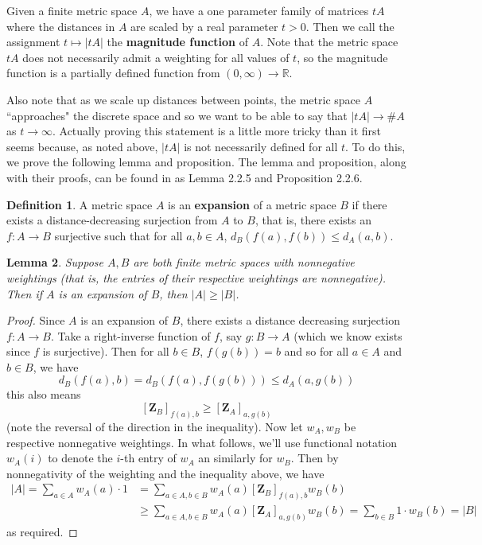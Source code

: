 \documentclass[11pt]{article}
\theoremstyle{definition}
\newtheorem{defn}{Definition}
\theoremstyle{definition}
\theoremstyle{plain}
\theoremstyle{plain}
\theoremstyle{plain}
\newtheorem{lem}[defn]{Lemma}
\theoremstyle{definition}
\begin{document}
Given a finite metric space $A$, we have a one parameter family of matrices $tA$ where the distances in $A$ are scaled by a real parameter $t > 0$. Then we call the assignment $t\mapsto\vert tA \vert$ the \textbf{magnitude function} of $A$. Note that the metric space $tA$ does not necessarily admit a weighting for all values of $t$, so the magnitude function is a partially defined function from $(0,\infty)\to\mathbb{R}$.

Also note that as we scale up distances between points, the metric space $A$ ``approaches" the discrete space and so we want to be able to say that $\vert tA \vert \to \#A$ as $t \to \infty$. Actually proving this statement is a little more tricky than it first seems because, as noted above, $\vert tA \vert$ is not necessarily defined for all $t$. To do this, we prove the following lemma and proposition. The lemma and proposition, along with their proofs, can be found in \cite{leinster_magnitude_nodate} as Lemma 2.2.5 and Proposition 2.2.6.

\begin{defn}
A metric space $A$ is an \textbf{expansion} of a metric space $B$ if there exists a distance-decreasing surjection from $A$ to $B$, that is, there exists an $f: A \to B$ surjective such that for all $a,b \in A$, $d_{B}(f(a),f(b)) \leq d_{A}(a,b)$.
\end{defn}

\begin{lem}\label{lem:expansion}
Suppose $A,B$ are both finite metric spaces with nonnegative weightings (that is, the entries of their respective weightings are nonnegative). Then if $A$ is an expansion of $B$, then $\vert A \vert \geq \vert B \vert$.
\end{lem}

\begin{proof}
Since $A$ is an expansion of $B$, there exists a distance decreasing surjection $f: A \to B$. Take a right-inverse function of $f$, say $g: B \to A$ (which we know exists since $f$ is surjective). Then for all $b \in B$, $f(g(b)) = b$ and so for all $a \in A$ and $b \in B$, we have
\begin{equation*}
d_{B}(f(a),b) = d_{B}(f(a),f(g(b))) \leq d_{A}(a,g(b))
\end{equation*}
this also means
\begin{equation*}
\left[\mathbf{Z}_B\right]_{f(a),b} \geq \left[\mathbf{Z}_{A}\right]_{a,g(b)}
\end{equation*}
(note the reversal of the direction in the inequality). Now let $w_A,w_B$ be respective nonnegative weightings. In what follows, we'll use functional notation $w_A(i)$ to denote the $i$-th entry of $w_A$ an similarly for $w_B$. Then by nonnegativity of the weighting and the inequality above, we have
\begin{align*}
\vert A \vert = \sum\limits_{a\in A} w_A(a) \cdot 1 &= \sum\limits_{a\in A, b\in B} w_A(a) \left[\mathbf{Z}_{B}\right]_{f(a),b}w_B(b) \\
&\geq \sum\limits_{a\in A, b \in B} w_{A}(a) \left[\mathbf{Z}_{A}\right]_{a,g(b)} w_{B}(b) = \sum\limits_{b\in B} 1\cdot w_B(b) = \vert B \vert
\end{align*}
as required.
\end{proof}
\end{document}

